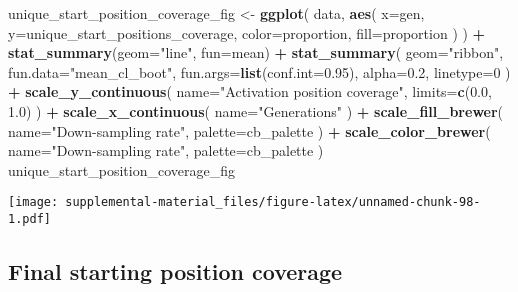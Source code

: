 \documentclass[]{book}
\newenvironment{Shaded}{\begin{snugshade}}{\end{snugshade}}
\newcommand{\DataTypeTok}[1]{\textcolor[rgb]{0.13,0.29,0.53}{#1}}
\newcommand{\DecValTok}[1]{\textcolor[rgb]{0.00,0.00,0.81}{#1}}
\newcommand{\FloatTok}[1]{\textcolor[rgb]{0.00,0.00,0.81}{#1}}
\newcommand{\KeywordTok}[1]{\textcolor[rgb]{0.13,0.29,0.53}{\textbf{#1}}}
\newcommand{\NormalTok}[1]{#1}
\newcommand{\OperatorTok}[1]{\textcolor[rgb]{0.81,0.36,0.00}{\textbf{#1}}}
\newcommand{\StringTok}[1]{\textcolor[rgb]{0.31,0.60,0.02}{#1}}
\begin{document}
\begin{Shaded}
\begin{Highlighting}[]
\NormalTok{unique_start_position_coverage_fig <-}\StringTok{ }\KeywordTok{ggplot}\NormalTok{(}
\NormalTok{    data,}
    \KeywordTok{aes}\NormalTok{(}
      \DataTypeTok{x=}\NormalTok{gen,}
      \DataTypeTok{y=}\NormalTok{unique_start_positions_coverage,}
      \DataTypeTok{color=}\NormalTok{proportion,}
      \DataTypeTok{fill=}\NormalTok{proportion}
\NormalTok{    )}
\NormalTok{  ) }\OperatorTok{+}
\StringTok{  }\KeywordTok{stat_summary}\NormalTok{(}\DataTypeTok{geom=}\StringTok{"line"}\NormalTok{, }\DataTypeTok{fun=}\NormalTok{mean) }\OperatorTok{+}
\StringTok{  }\KeywordTok{stat_summary}\NormalTok{(}
    \DataTypeTok{geom=}\StringTok{"ribbon"}\NormalTok{,}
    \DataTypeTok{fun.data=}\StringTok{"mean_cl_boot"}\NormalTok{,}
    \DataTypeTok{fun.args=}\KeywordTok{list}\NormalTok{(}\DataTypeTok{conf.int=}\FloatTok{0.95}\NormalTok{),}
    \DataTypeTok{alpha=}\FloatTok{0.2}\NormalTok{,}
    \DataTypeTok{linetype=}\DecValTok{0}
\NormalTok{  ) }\OperatorTok{+}
\StringTok{  }\KeywordTok{scale_y_continuous}\NormalTok{(}
    \DataTypeTok{name=}\StringTok{"Activation position coverage"}\NormalTok{,}
    \DataTypeTok{limits=}\KeywordTok{c}\NormalTok{(}\FloatTok{0.0}\NormalTok{, }\FloatTok{1.0}\NormalTok{)}
\NormalTok{  ) }\OperatorTok{+}
\StringTok{  }\KeywordTok{scale_x_continuous}\NormalTok{(}
    \DataTypeTok{name=}\StringTok{"Generations"}
\NormalTok{  ) }\OperatorTok{+}
\StringTok{  }\KeywordTok{scale_fill_brewer}\NormalTok{(}
    \DataTypeTok{name=}\StringTok{"Down-sampling rate"}\NormalTok{,}
    \DataTypeTok{palette=}\NormalTok{cb_palette}
\NormalTok{  ) }\OperatorTok{+}
\StringTok{  }\KeywordTok{scale_color_brewer}\NormalTok{(}
    \DataTypeTok{name=}\StringTok{"Down-sampling rate"}\NormalTok{,}
    \DataTypeTok{palette=}\NormalTok{cb_palette}
\NormalTok{  )}
\NormalTok{unique_start_position_coverage_fig}
\end{Highlighting}
\end{Shaded}

\texttt{[image: supplemental-material\_files/figure-latex/unnamed-chunk-98-1.pdf]}

\hypertarget{final-starting-position-coverage-7}{%
\subsection{Final starting position coverage}\label{final-starting-position-coverage-7}}
\end{document}
